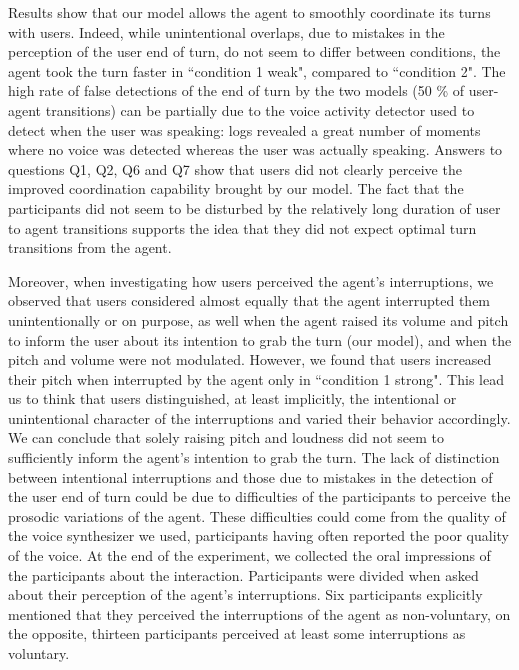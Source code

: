 Results show that our model allows the agent to smoothly coordinate its turns with users. Indeed, while unintentional overlaps, due to mistakes in the perception of the user end of turn, do not seem to differ between conditions, the agent took the turn faster in ``condition 1 weak", compared to ``condition 2". The high rate of false detections of the end of turn by the two models (50 \% of user-agent transitions) can be partially due to the voice activity detector used to detect when the user was speaking: logs revealed a great number of moments where no voice was detected whereas the user was actually speaking. 
Answers to questions Q1, Q2, Q6 and Q7 show that users did not clearly perceive the improved coordination capability brought by our model. The fact that the participants did not seem to be disturbed by the relatively long duration of user to agent transitions supports the idea that they did not expect optimal turn transitions from the agent.

Moreover, when investigating how users perceived the agent's interruptions, we observed that users considered almost equally that the agent interrupted them unintentionally or on purpose, as well when the agent raised its volume and pitch to inform the user about its intention to grab the turn (our model), and when the pitch and volume were not modulated. However, we found that users increased their pitch when interrupted by the agent only in ``condition 1 strong". This lead us to think that users distinguished, at least implicitly, the intentional or unintentional character of the interruptions and varied their behavior accordingly. We can conclude that solely raising pitch and loudness did not seem to sufficiently inform the agent's intention to grab the turn. The lack of distinction between intentional interruptions and those due to mistakes in the detection of the user end of turn could be due to difficulties of the participants to perceive the prosodic variations of the agent. These difficulties could come from the quality of the voice synthesizer we used, participants having often reported the poor quality of the voice. 
At the end of the experiment, we collected the oral impressions of the participants about the interaction. Participants were divided when asked about their perception of the agent's interruptions. Six participants explicitly mentioned that they perceived the interruptions of the agent as non-voluntary, on the opposite, thirteen participants perceived at least some interruptions as voluntary. 

